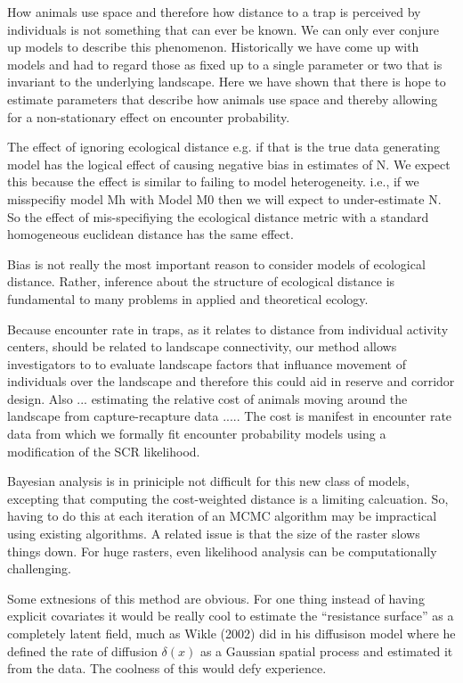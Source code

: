 How animals use space and therefore how distance to a trap is
perceived by individuals is not something that can ever be known. We
can only ever conjure up models to describe this
phenomenon. Historically we have come up with models and had to regard
those as fixed up to a single parameter or two that is invariant to
the underlying landscape. Here we have shown that there is hope to
estimate parameters that describe how animals use space and thereby
allowing for a non-stationary effect on encounter probability.


The effect of ignoring ecological distance e.g. if that is the true
data generating model has the logical effect of causing negative bias
in estimates of N. We expect this because the effect is similar to
failing to model heterogeneity. i.e., if we misspecifiy model Mh with
Model M0 then we will expect to under-estimate N. So the effect of
mis-specifiying the ecological distance metric with a standard
homogeneous euclidean distance has the same effect.

Bias is not really the most important reason to consider models of
ecological distance. Rather, inference about the structure of
ecological distance is fundamental to many problems in applied and
theoretical ecology.

Because encounter rate in traps, as it relates to distance from
individual activity centers, should be related to landscape
connectivity, our method allows investigators to to evaluate landscape
factors that influance movement of individuals over the landscape and
therefore this could aid in reserve and corridor design.  Also ...
estimating the relative cost of animals moving around the landscape
from capture-recapture data ..... The cost is manifest in encounter
rate data from which we formally fit encounter probability models
using a modification of the SCR likelihood.

Bayesian analysis is in priniciple not difficult for this new class of
models, excepting that computing the cost-weighted distance is a
limiting calcuation. So, having to do this at each iteration of an
MCMC algorithm may be impractical using existing algorithms.
A related issue is that the size of the raster slows things down. For
huge rasters, even likelihood analysis can be computationally challenging.

Some extnesions of this method are obvious. For one thing instead of
having explicit covariates it would be really cool to estimate the
``resistance surface'' as a completely latent field, much as Wikle
(2002) did in his diffusison model where he defined the rate of
diffusion $\delta(x)$ as a Gaussian spatial process and estimated it
from the data.  The coolness of this would defy experience. 
















